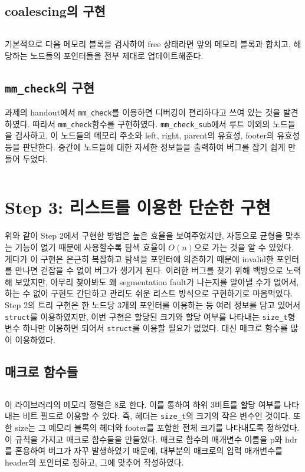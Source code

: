 \documentclass{report}
\begin{document}
\subsection{coalescing의 구현}
\inputminted[firstline=102,lastline=158, linenos, breaklines]{C}{mm_old_2.c}
기본적으로 다음 메모리 블록을 검사하여 free 상태라면 앞의 메모리 블록과 합치고, 해당하는 노드들의 포인터들을 전부 제대로 업데이트해준다.

\subsection{\lstinline{mm_check}의 구현}
과제의 handout에서 \lstinline{mm_check}를 이용하면 디버깅이 편리하다고 쓰여 있는 것을 발견하였다. 따라서 \lstinline{mm_check}함수를 구현하였다. \lstinline{mm_check_sub}에서 루트 이외의 노드들을 검사하고, 이 노드들의 메모리 주소와 left, right, parent의 유효성, footer의 유효성 등을 판단한다. 중간에 노드들에 대한 자세한 정보들을 출력하여 버그를 잡기 쉽게 만들어 두었다.

\inputminted[firstline=441,lastline=542, linenos, breaklines]{C}{mm_old_2.c}
\section{Step 3: 리스트를 이용한 단순한 구현}
위와 같이 Step 2에서 구현한 방법은 높은 효율을 보여주었지만, 자동으로 균형을 맞추는 기능이 없기 때문에 사용할수록 탐색 효율이 $O(n)$으로 가는 것을 알 수 있었다. 게다가 이 구현은 은근히 복잡하고 탐색을 포인터에 의존하기 때문에 invalid한 포인터를 만나면 걷잡을 수 없이 버그가 생기게 된다. 이러한 버그를 찾기 위해 백방으로 노력해 보았지만, 아무리 찾아봐도 왜 segmentation fault가 나는지를 알아낼 수가 없어서, 하는 수 없이 구현도 간단하고 관리도 쉬운 리스트 방식으로 구현하기로 마음먹었다. Step 2의 트리 구현은 한 노드당 3개의 포인터를 이용하는 등 여러 정보를 담고 있어서 \lstinline{struct}를 이용하였지만, 이번 구현은 할당된 크기와 할당 여부를 나타내는 \lstinline{size_t}형 변수 하나만 이용하면 되어서 \lstinline{struct}를 이용할 필요가 없었다. 대신 매크로 함수를 많이 이용하였다.

\subsection{매크로 함수들}
\inputminted[firstline=27,lastline=50, linenos, breaklines]{C}{mm.c}
이 라이브러리의 메모리 정렬은 8로 한다. 이를 통하여 하위 3비트를 할당 여부를 나타내는 비트 필드로 이용할 수 있다. 즉, 헤더는 \lstinline{size_t}의 크기의 작은 변수인 것이다. 또한 size는 그 메모리 블록의 헤더와 footer를 포함한 전체 크기를 나타내도록 정하였다. 이 규칙을 가지고 매크로 함수들을 만들었다.
매크로 함수의 매개변수 이름을 p와 hdr를 혼용하여 버그가 자꾸 발생하였기 때문에, 대부분의 매크로의 입력 매개변수를 header의 포인터로 정하고, 그에 맞추어 작성하였다.
\end{document}

